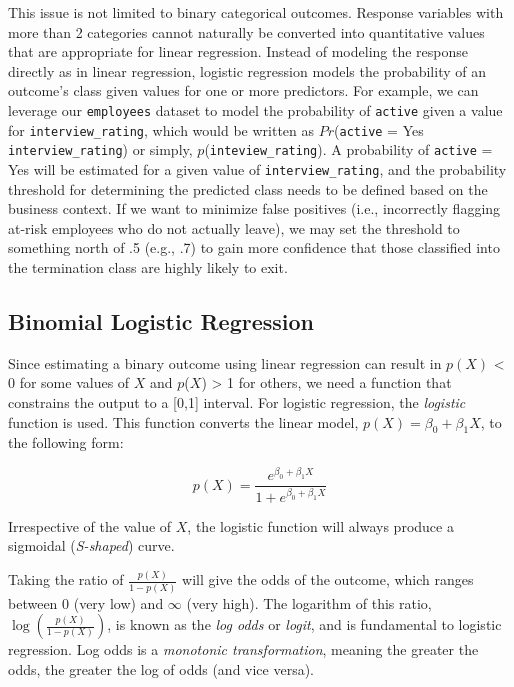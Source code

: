 \documentclass[
]{book}
\begin{document}
This issue is not limited to binary categorical outcomes. Response variables with more than 2 categories cannot naturally be converted into quantitative values that are appropriate for linear regression. Instead of modeling the response directly as in linear regression, logistic regression models the probability of an outcome's class given values for one or more predictors. For example, we can leverage our \texttt{employees} dataset to model the probability of \texttt{active} given a value for \texttt{interview\_rating}, which would be written as \(Pr\)(\texttt{active} = Yes \textbar{} \texttt{interview\_rating}) or simply, \(p\)(\texttt{inteview\_rating}). A probability of \texttt{active} = Yes will be estimated for a given value of \texttt{interview\_rating}, and the probability threshold for determining the predicted class needs to be defined based on the business context. If we want to minimize false positives (i.e., incorrectly flagging at-risk employees who do not actually leave), we may set the threshold to something north of .5 (e.g., .7) to gain more confidence that those classified into the termination class are highly likely to exit.

\hypertarget{binomial-logistic-regression}{%
\subsection{Binomial Logistic Regression}\label{binomial-logistic-regression}}

Since estimating a binary outcome using linear regression can result in \(p(X)\) \textless{} 0 for some values of \(X\) and \(p\)(\(X\)) \textgreater{} 1 for others, we need a function that constrains the output to a {[}0,1{]} interval. For logistic regression, the \emph{logistic} function is used. This function converts the linear model, \(p(X) = \beta_0 + \beta_1 X\), to the following form:

\[ p(X) = \frac{e^{\beta_0 + \beta_1 X}}{1+e^{\beta_0 + \beta_1 X}} \]

Irrespective of the value of \(X\), the logistic function will always produce a sigmoidal (\emph{S-shaped}) curve.

Taking the ratio of \(\frac {p(X)}{1 - p(X)}\) will give the odds of the outcome, which ranges between 0 (very low) and \(\infty\) (very high). The logarithm of this ratio, \(\log(\frac {p(X)}{1 - p(X)})\), is known as the \emph{log odds} or \emph{logit}, and is fundamental to logistic regression. Log odds is a \emph{monotonic transformation}, meaning the greater the odds, the greater the log of odds (and vice versa).
\end{document}
